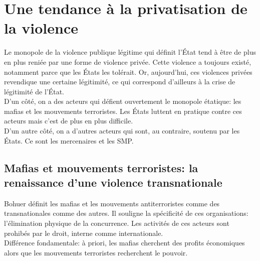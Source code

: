 \documentclass[10pt, a4paper, openany]{book}
\begin{document}
\section{Une tendance à la privatisation de la violence}

Le monopole de la violence publique légitime qui définit l'État tend à être de plus en plus reniée par une forme de violence privée. Cette violence a toujours existé, notamment parce que les États les tolérait. Or, aujourd'hui, ces violences privées revendique une certaine légitimité, ce qui correspond d'ailleurs à la crise de légitimité de l'État. \\
D'un côté, on a des acteurs qui défient ouvertement le monopole étatique: les mafias et les mouvements terroristes. Les États luttent en pratique contre ces acteurs mais c'est de plus en plus difficile. \\
D'un autre côté, on a d'autres acteurs qui sont, au contraire, soutenu par les États. Ce sont les mercenaires et les SMP.

\subsection{Mafias et mouvements terroristes: la renaissance d'une violence transnationale}

Bohuer définit les mafias et les mouvements antiterroristes comme des transnationales comme des autres. Il souligne la spécificité de ces organisations: l'élimination physique de la concurrence. Les activités de ces acteurs sont prohibés par le droit, interne comme internationale. \\
Différence fondamentale: à priori, les mafias cherchent des profits économiques alors que les mouvements terroristes recherchent le pouvoir. 
\end{document}
